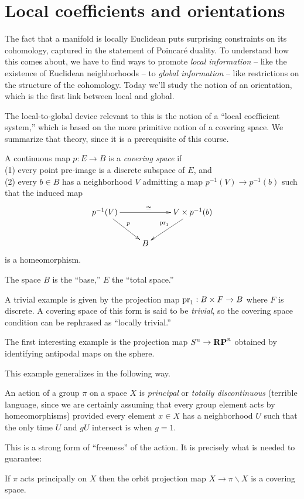 \section{Local coefficients and orientations}

The fact that a manifold is locally Euclidean puts surprising constraints on
its cohomology, captured in the statement of Poincar\'e duality.
To understand how this comes about, we have to find ways to promote
{\em local information} -- like the existence of Euclidean neighborhoods --
to {\em global information} -- like restrictions on the structure of the
cohomology. Today we'll study the notion of an orientation, which is the first 
link between local and global.

The local-to-global device relevant to this is the notion of a ``local
coefficient system,'' which is based on the more primitive notion of a 
covering space. We summarize that theory, since it is a prerequisite 
of this course.

\begin{definition}
A continuous map $p:E\to B$ is a {\em covering space} if \\
(1) every point pre-image is a discrete subspace of $E$, and \\
(2) every $b\in B$ has a neighborhood $V$ admitting a map $p^{-1}(V)\to p^{-1}(b)$ such that the induced map
\[
\xymatrix{
p^{-1}(V) \ar[rr]^\cong \ar[dr]^p && V\times p^{-1}(b) \ar[dl]_{\pr_1} \\
& B
}\]
is a homeomorphism.
\end{definition}
The space $B$ is the ``base,'' $E$ the ``total space.''

\begin{example} 
A trivial example is given by the projection map $\mathrm{pr}_1:B\times F\to B$ where
$F$ is discrete. A covering space of this form is said to be {\em trivial},
so the covering space condition can be rephrased as ``locally trivial.'' 

The first interesting example is the projection map
$S^n\to \mathbf{RP}^n$ obtained by identifying antipodal maps on the sphere. 
\end{example}

This example generalizes in the following way. 
\begin{definition} An action of a group $\pi$ on a space $X$ is
{\em principal} or {\em totally discontinuous} (terrible language,
since we are certainly assuming that every group element acts by
homeomorphisms) provided every element $x\in X$ has a neighborhood
$U$ such that the only time $U$ and $gU$ intersect is when $g=1$. 
\end{definition}
This is a strong form of ``freeness'' of the action. It is precisely
what is needed to guarantee:
\begin{lemma}
If $\pi$ acts principally on $X$ then the orbit projection map
$X\to \pi\backslash X$ is a covering space.
\end{lemma} 

